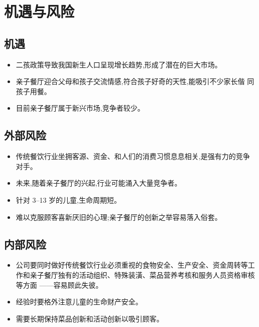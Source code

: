 \chapter{机遇与风险}

\section{机遇}
\begin{itemize}
\item  二孩政策导致我国新生人口呈现增长趋势,形成了潜在的巨大市场。
\item  亲子餐厅迎合父母和孩子交流情感,符合孩子好奇的天性,能吸引不少家长偕
同孩子用餐。
\item  目前亲子餐厅属于新兴市场,竞争者较少。
\end{itemize}

\section{外部风险}
\begin{itemize}
\item  传统餐饮行业坐拥客源、资金、和人们的消费习惯息息相关,是强有力的竞争
对手。
\item  未来,随着亲子餐厅的兴起,行业可能涌入大量竞争者。
\item  针对 3--13 岁的儿童,生命周期短。
\item  难以克服顾客喜新厌旧的心理;亲子餐厅的创新之举容易落入俗套。
\end{itemize}

\section{内部风险}
\begin{itemize}
\item  公司要同时做好传统餐饮行业必须重视的食物安全、生产安全、资金周转等工
作和亲子餐厅独有的活动组织、特殊装潢、菜品营养考核和服务人员资格审核等方面
——容易顾此失彼。
\item  经验时要格外注意儿童的生命财产安全。
\item  需要长期保持菜品创新和活动创新以吸引顾客。
\end{itemize}

